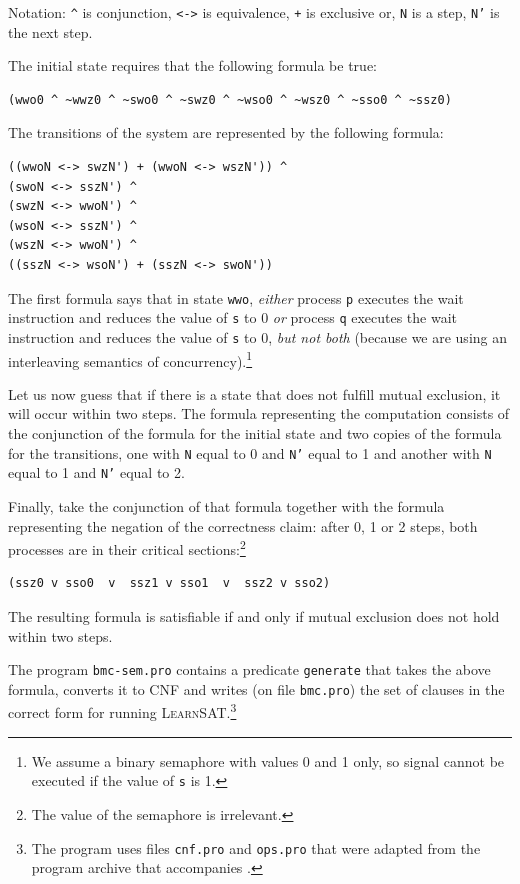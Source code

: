 \documentclass[11pt]{report}
\newcommand*{\p}[1]{\textup{\texttt{#1}}}
\newcommand*{\ls}{\textsc{LearnSAT}}
\begin{document}
Notation: \verb=^= is conjunction, \verb=<->= is equivalence, \verb=+= is
exclusive or, \p{N} is a step, \p{N'} is the next step.

The initial state requires that the following formula be true:
\begin{verbatim}
(wwo0 ^ ~wwz0 ^ ~swo0 ^ ~swz0 ^ ~wso0 ^ ~wsz0 ^ ~sso0 ^ ~ssz0)
\end{verbatim}

The transitions of the system are represented by the following formula:
\begin{verbatim}
((wwoN <-> swzN') + (wwoN <-> wszN')) ^
(swoN <-> sszN') ^
(swzN <-> wwoN') ^
(wsoN <-> sszN') ^
(wszN <-> wwoN') ^
((sszN <-> wsoN') + (sszN <-> swoN'))
\end{verbatim}

The first formula says that in state \p{wwo}, \emph{either} process
\p{p} executes the wait instruction and reduces the value of \p{s} to 0
\emph{or} process \p{q} executes the wait instruction and reduces the
value of \p{s} to 0, \emph{but not both} (because we are using an
interleaving semantics of concurrency).\footnote{We assume a binary
semaphore with values 0 and 1 only, so signal cannot be executed if
the value of \p{s} is 1.}

Let us now guess that if there is a state that does not fulfill mutual
exclusion, it will occur within two steps. The formula representing
the computation consists of the conjunction of the formula for the
initial state and two copies of the formula for the transitions, one
with \p{N} equal to 0 and \p{N'} equal to 1 and another with \p{N} equal
to 1 and \p{N'} equal to 2.

Finally, take the conjunction of that formula together with the formula
representing the negation of the correctness claim: after 0, 1 or 2
steps, both processes are in their critical sections:\footnote{The value
of the semaphore is irrelevant.}

\begin{verbatim}
(ssz0 v sso0  v  ssz1 v sso1  v  ssz2 v sso2)
\end{verbatim}

The resulting formula is satisfiable if and only if mutual exclusion
does not hold within two steps.

The program \p{bmc-sem.pro} contains a predicate \p{generate} that takes
the above formula, converts it to CNF and writes (on file \p{bmc.pro})
the set of clauses in the correct form for running
\ls{}.\footnote{The program uses files \p{cnf.pro} and \p{ops.pro}
that were adapted from the program archive that accompanies
\cite{mlcs}.}
\end{document}

